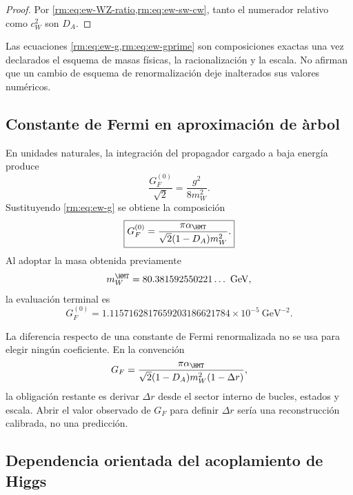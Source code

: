\begin{proof}
Por \cref{rm:eq:ew-WZ-ratio,rm:eq:ew-sw-cw}, tanto el numerador relativo como
\(c_W^2\) son \(D_A\).
\end{proof}

Las ecuaciones \cref{rm:eq:ew-g,rm:eq:ew-gprime} son composiciones exactas una
vez declarados el esquema de masas f\'isicas, la racionalizaci\'on y la escala. No
afirman que un cambio de esquema de renormalizaci\'on deje inalterados sus
valores num\'ericos.

\subsection{Constante de Fermi en aproximaci\'on de \`arbol}

En unidades naturales, la integraci\'on del propagador cargado a baja
energ\'ia produce
\begin{equation}
\label{rm:eq:ew-GF-def}
\frac{G_F^{(0)}}{\sqrt2}=\frac{g^2}{8m_W^2}.
\end{equation}
Sustituyendo \cref{rm:eq:ew-g} se obtiene la composici\'on
\begin{equation}
\label{rm:eq:ew-GF}
\boxed{
G_F^{(0)}
=\frac{\pi\alpha_{\HMT}}
{\sqrt2(1-D_A)m_W^2}.}
\end{equation}
Al adoptar la masa obtenida previamente
\begin{equation}
\label{rm:eq:ew-W-output}
m_W^{\HMT}=80.381592550221\ldots\ \mathrm{GeV},
\end{equation}
la evaluaci\'on terminal es
\begin{equation}
\label{rm:eq:ew-GF-value}
\boxed{
G_F^{(0)}
=1.1157162817659203186621784\times10^{-5}\ \mathrm{GeV}^{-2}.}
\end{equation}

La diferencia respecto de una constante de Fermi renormalizada no se usa
para elegir ning\'un coeficiente. En la convenci\'on
\begin{equation}
\label{rm:eq:ew-Delta-r}
G_F
=\frac{\pi\alpha_{\HMT}}
{\sqrt2(1-D_A)m_W^2(1-\Delta r)},
\end{equation}
la obligaci\'on restante es derivar \(\Delta r\) desde el sector interno de
bucles, estados y escala. Abrir el valor observado de \(G_F\) para definir
\(\Delta r\) ser\'ia una reconstrucci\'on calibrada, no una predicci\'on.

\subsection{Dependencia orientada del acoplamiento de Higgs}

